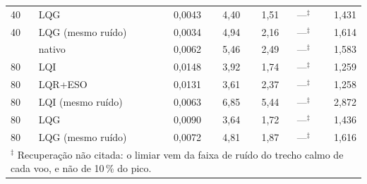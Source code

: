 \begin{tabular}{llrrrrr}
40 & LQG & 0,0043 & 4,40 & 1,51 & ---$^\ddagger$ & 1,431 \\
40 & LQG (mesmo ruído) & 0,0034 & 4,94 & 2,16 & ---$^\ddagger$ & 1,614 \\
\addlinespace
80 & nativo & 0,0062 & 5,46 & 2,49 & ---$^\ddagger$ & 1,583 \\
80 & LQI & 0,0148 & 3,92 & 1,74 & ---$^\ddagger$ & 1,259 \\
80 & LQR+ESO & 0,0131 & 3,61 & 2,37 & ---$^\ddagger$ & 1,258 \\
80 & LQI (mesmo ruído) & 0,0063 & 6,85 & 5,44 & ---$^\ddagger$ & 2,872 \\
80 & LQG & 0,0090 & 3,64 & 1,72 & ---$^\ddagger$ & 1,436 \\
80 & LQG (mesmo ruído) & 0,0072 & 4,81 & 1,87 & ---$^\ddagger$ & 1,616 \\
\bottomrule
\multicolumn{7}{l}{\footnotesize $^\ddagger$ Recuperação não citada: o limiar vem da faixa de ruído do trecho calmo de cada voo, e não de 10\,\% do pico.} \\
\end{tabular}
